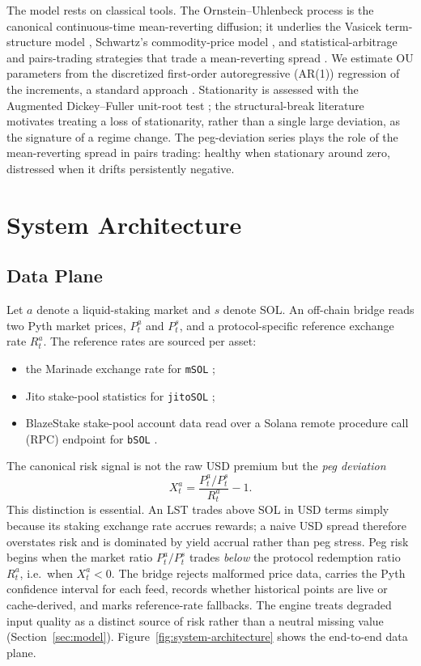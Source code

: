 \documentclass[aps,prx,reprint,nofootinbib,longbibliography]{revtex4-2}
\begin{document}
The model rests on classical tools. The Ornstein--Uhlenbeck process
\cite{ou} is the canonical continuous-time mean-reverting diffusion; it underlies
the Vasicek term-structure model \cite{vasicek1977}, Schwartz's commodity-price
model \cite{schwartz1997}, and statistical-arbitrage and pairs-trading strategies
that trade a mean-reverting spread \cite{avellaneda_lee2010,gatev_2006}. We
estimate OU parameters from the discretized first-order autoregressive (AR(1))
regression of the increments, a
standard approach \cite{hamilton1994}. Stationarity is assessed with the
Augmented Dickey--Fuller unit-root test \cite{adf,said_dickey1984}; the
structural-break literature \cite{andrews1993,bai_perron2003} motivates treating a
loss of stationarity, rather than a single large deviation, as the signature of a
regime change. The peg-deviation series plays the role of the mean-reverting spread
in pairs trading: healthy when stationary around zero, distressed when it drifts
persistently negative.

\section{System Architecture}
\label{sec:arch}

\subsection{Data Plane}

Let $a$ denote a liquid-staking market and $s$ denote SOL. An off-chain bridge
reads two Pyth market prices, $P^a_t$ and $P^s_t$, and a protocol-specific
reference exchange rate $R^a_t$. The reference rates are sourced per asset:
\begin{itemize}
\item the Marinade exchange rate for \texttt{mSOL} \cite{marinade_msol};
\item Jito stake-pool statistics for \texttt{jitoSOL} \cite{jito_jitosol};
\item BlazeStake stake-pool account data read over a Solana remote procedure call
(RPC) endpoint for \texttt{bSOL}
\cite{solblaze_bsol}.
\end{itemize}
The canonical risk signal is not the raw USD premium but the \emph{peg deviation}
\begin{equation}
X^a_t = \frac{P^a_t/P^s_t}{R^a_t} - 1.
\label{eq:peg-deviation}
\end{equation}
This distinction is essential. An LST trades above SOL in USD terms simply because
its staking exchange rate accrues rewards; a naive USD spread therefore overstates
risk and is dominated by yield accrual rather than peg stress. Peg risk begins when
the market ratio $P^a_t/P^s_t$ trades \emph{below} the protocol redemption ratio
$R^a_t$, i.e.\ when $X^a_t<0$. The bridge rejects malformed price data, carries the
Pyth confidence interval for each feed, records whether historical points are live
or cache-derived, and marks reference-rate fallbacks. The engine treats degraded
input quality as a distinct source of risk rather than a neutral missing value
(Section~\ref{sec:model}). Figure~\ref{fig:system-architecture} shows the
end-to-end data plane.
\end{document}
